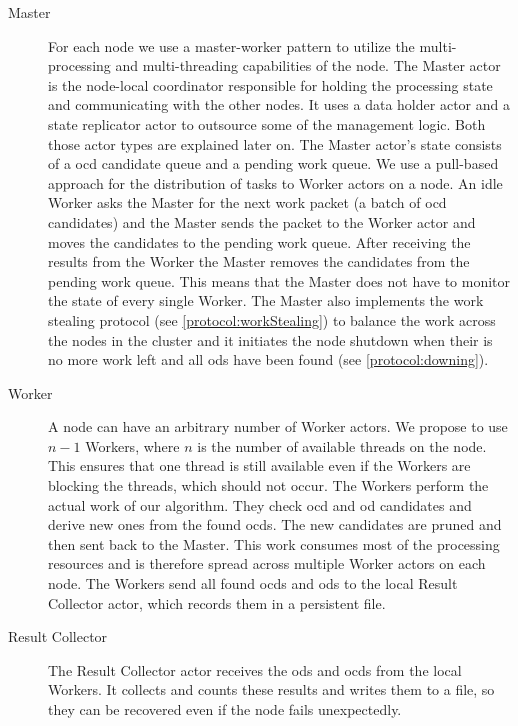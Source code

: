   \begin{description}
  \item[Master]
    For each node we use a master-worker pattern to utilize the multi-processing and multi-threading capabilities of the node.
    The Master actor is the node-local coordinator responsible for holding the processing state and communicating with the other nodes.
    It uses a data holder actor and a state replicator actor to outsource some of the management logic.
    Both those actor types are explained later on.
    The Master actor's state consists of a \gls{ocd} candidate queue and a pending work queue.
    We use a pull-based approach for the distribution of tasks to Worker actors on a node.
    An idle Worker asks the Master for the next work packet (a batch of \gls{ocd} candidates) and the Master sends the packet to the Worker actor and moves the candidates to the pending work queue.
    After receiving the results from the Worker the Master removes the candidates from the pending work queue.
    This means that the Master does not have to monitor the state of every single Worker.
    The Master also implements the work stealing protocol (see \cref{protocol:workStealing}) to balance the work across the nodes in the cluster and it initiates the node shutdown when their is no more work left and all \glspl{od} have been found (see \cref{protocol:downing}).

  \item[Worker]
    A node can have an arbitrary number of Worker actors.
    We propose to use $n - 1$ Workers, where $n$ is the number of available threads on the node.
    This ensures that one thread is still available even if the Workers are blocking the threads, which should not occur.
    The Workers perform the actual work of our algorithm.
    They check \gls{ocd} and \gls{od} candidates and derive new ones from the found \glspl{ocd}.
    The new candidates are pruned and then sent back to the Master.
    This work consumes most of the processing resources and is therefore spread across multiple Worker actors on each node.
    The Workers send all found \glspl{ocd} and \glspl{od} to the local Result Collector actor, which records them in a persistent file.

  \item[Result Collector]
    The Result Collector actor receives the \glspl{od} and \glspl{ocd} from the local Workers.
    It collects and counts these results and writes them to a file, so they can be recovered even if the node fails unexpectedly.


\end{description}
